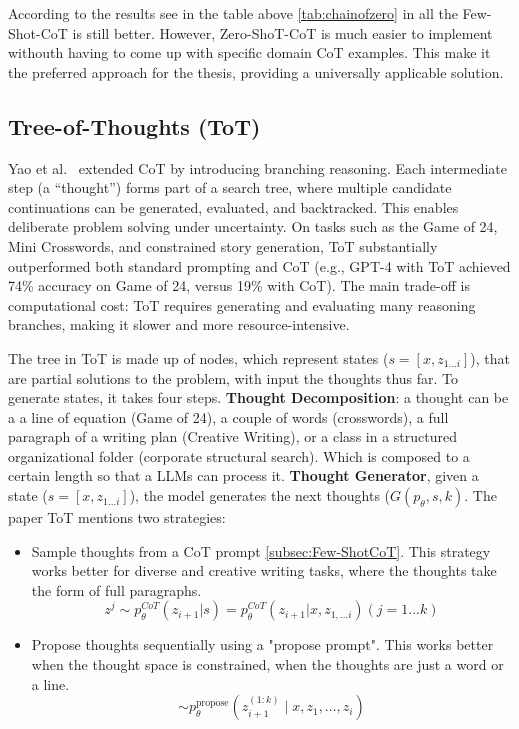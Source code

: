 According to the results see in the table above \ref{tab:chainofzero} in all the Few-Shot-CoT is still better. However, Zero-ShoT-CoT is much easier to implement withouth having to come up with specific domain CoT examples. This make it the preferred approach for the thesis, providing a universally applicable solution.


\subsection{Tree-of-Thoughts (ToT)}
Yao et al.~\cite{treeofthought} extended CoT by introducing branching reasoning. Each intermediate step (a ``thought'') forms part of a search tree, where multiple candidate continuations can be generated, evaluated, and backtracked. This enables deliberate problem solving under uncertainty. On tasks such as the Game of 24, Mini Crosswords, and constrained story generation, ToT substantially outperformed both standard prompting and CoT (e.g., \gls{GPT}-4 with ToT achieved 74\% accuracy on Game of 24, versus 19\% with CoT). The main trade-off is computational cost: ToT requires generating and evaluating many reasoning branches, making it slower and more resource-intensive.

The tree in ToT is made up of nodes, which represent states ($s=[x, z_{1...i}]$), that are partial solutions to the problem, with input the thoughts thus far. To generate states, it takes four steps. \textbf{Thought Decomposition}: a thought can be a a line of equation (Game of 24), a couple of words (crosswords),  a full paragraph of a writing plan (Creative Writing), or a class in a structured organizational folder (corporate structural search). Which is composed to a certain length so that a \glspl{LLM} can process it. \textbf{Thought Generator}, given a state ($s=[x, z_{1...i}]$), the model generates the next thoughts ($G(p_\theta,s,k)$. The paper ToT mentions two strategies:
\begin{itemize}
    \item Sample thoughts from a CoT prompt \ref{subsec:Few-ShotCoT}. This strategy works better for diverse and creative writing tasks,  where the thoughts take the form of full paragraphs.
\begin{equation}
    z^{j}  \sim p_\theta^{CoT}(z_{i+1}|s) = p_\theta^{CoT}(z_{i+1}|x, z_{1,...i})(j = 1 ...k)
\end{equation}
    \item  Propose thoughts sequentially using a "propose prompt". This works better when the thought space is constrained, when the thoughts are just a word or a line.
\begin{equation}
[z_{i+1}^{(1)}, \dots, z_{i+1}^{(k)}] \sim p_\theta^{\text{propose}}(z_{i+1}^{(1:k)} \mid x, z_1, \dots, z_i)
\end{equation}
\end{itemize}

